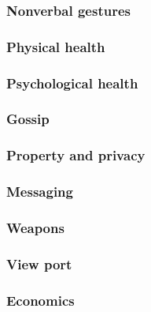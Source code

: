 \subsubsection{Nonverbal gestures}
\label{sec:future:rules:nonverbal}


\subsubsection{Physical health}
\label{sec:future:rules:health_physical}


\subsubsection{Psychological health}
\label{sec:future:rules:health_psychological}


\subsubsection{Gossip}
\label{sec:future:rules:gossip}


\subsubsection{Property and privacy}
\label{sec:future:rules:property_and_privacy}


\subsubsection{Messaging}
\label{sec:future:rules:messaging}


\subsubsection{Weapons}
\label{sec:future:rules:weapons}


\subsubsection{View port}
\label{sec:future:rules:view_port}


\subsubsection{Economics}
\label{sec:future:rules:economics}

